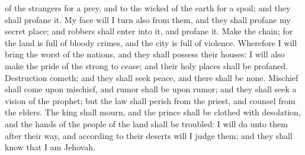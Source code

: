 of the strangers for a prey, and to the wicked of the earth for a spoil; and they shall profane it. My face will I turn also from them, and they shall profane my secret place; and robbers shall enter into it, and profane it.  Make the chain; for the land is full of bloody crimes, and the city is full of violence. Wherefore I will bring the worst of the nations, and they shall possess their houses: I will also make the pride of the strong to cease; and their holy places shall be profaned. Destruction cometh; and they shall seek peace, and there shall be none. Mischief shall come upon mischief, and rumor shall be upon rumor; and they shall seek a vision of the prophet; but the law shall perish from the priest, and counsel from the elders. The king shall mourn, and the prince shall be clothed with desolation, and the hands of the people of the land shall be troubled: I will do unto them after their way, and according to their deserts will I judge them; and they shall know that I am Jehovah. 

